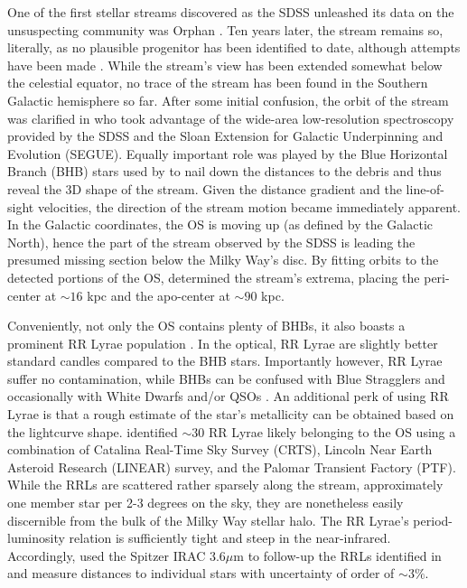 \documentclass[a4paper,useAMS,usenatbib]{mnras}
\begin{document}
One of the first stellar streams discovered as the SDSS unleashed its
data on the unsuspecting community was Orphan
\citep[see][]{OS_C,OS_V}. Ten years later, the stream remains so,
literally, as no plausible progenitor has been identified to date,
although attempts have been made
\citep[e.g.][]{Fellhauer2007,Jin2007,Sales2008,Casey2013,Casey2014,Grillmair2015}. While
the stream's view has been extended somewhat below the celestial
equator, no trace of the stream has been found in the Southern
Galactic hemisphere so far. After some initial confusion, the orbit
of the stream was clarified in \citet{Newberg2010} who took advantage
of the wide-area low-resolution spectroscopy provided by the SDSS and
the Sloan Extension for Galactic Underpinning and Evolution
(SEGUE). Equally important role was played by the Blue Horizontal
Branch (BHB) stars used by \citet{Newberg2010} to nail down the
distances to the debris and thus reveal the 3D shape of the
stream. Given the distance gradient and the line-of-sight velocities,
the direction of the stream motion became immediately apparent. In the
Galactic coordinates, the OS is moving up (as defined by the Galactic
North), hence the part of the stream observed by the SDSS is leading
the presumed missing section below the Milky Way's disc. By fitting
orbits to the detected portions of the OS, \citet{Newberg2010}
determined the stream's extrema, placing the peri-center at $\sim16$
kpc and the apo-center at $\sim90$ kpc.

Conveniently, not only the OS contains plenty of BHBs, it also boasts
a prominent RR Lyrae population \cite[see e.g.][]{Sesar2013}. In the
optical, RR Lyrae are slightly better standard candles compared to the
BHB stars. Importantly however, RR Lyrae suffer no contamination,
while BHBs can be confused with Blue Stragglers and occasionally with
White Dwarfs and/or QSOs \citep[see e.g.][]{Deason2014}. An additional
perk of using RR Lyrae is that a rough estimate of the star's
metallicity can be obtained based on the lightcurve
shape. \citet{Sesar2013} identified $\sim30$ RR Lyrae likely belonging
to the OS using a combination of Catalina Real-Time Sky Survey (CRTS),
Lincoln Near Earth Asteroid Research (LINEAR) survey, and the Palomar
Transient Factory (PTF). While the RRLs are scattered rather sparsely
along the stream, approximately one member star per 2-3 degrees on the
sky, they are nonetheless easily discernible from the bulk of the
Milky Way stellar halo. The RR Lyrae's period-luminosity relation is
sufficiently tight and steep in the near-infrared. Accordingly,
\citet{Hendel2018} used the Spitzer IRAC 3.6$\mu$m to follow-up the
RRLs identified in \citet{Sesar2010} and measure distances to
individual stars with uncertainty of order of $\sim3\%$.
\end{document}

